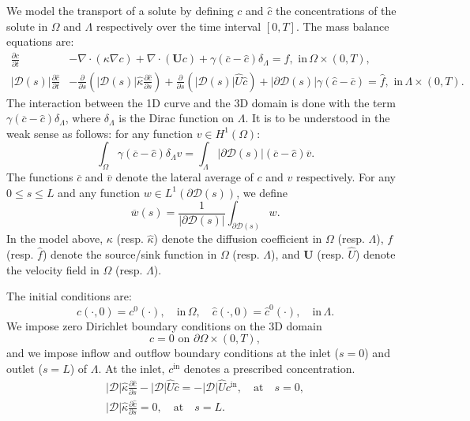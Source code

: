 \documentclass[pdflatex,sn-mathphys-num]{sn-jnl}%
\newcommand{\bfU}{{\boldsymbol U}}
\theoremstyle{thmstyleone}%
\theoremstyle{thmstyletwo}%
\theoremstyle{thmstylethree}%
\begin{document}
We model the transport of a solute by defining $c$ and $\hat c$ the concentrations of the solute in $\Omega$ and $\Lambda$ respectively over the time interval $[0,T]$. The mass balance equations are:
\begin{align}
\frac{\partial c}{\partial t} & - \nabla \cdot (\kappa \nabla c) +\nabla \cdot (\bfU c) 
+ \gamma (\overline{c} - \hat{c}) \delta_\Lambda = f, \,\, \mbox{in}\,\Omega\times (0,T),\label{eq:3D}\\
|\mathcal{D}(s)|\frac{\partial \hat c}{\partial t} & - \frac{\partial}{\partial s}\left(|\mathcal{D}(s)|\hat \kappa \frac{\partial\hat c}{\partial s}\right) +\frac{\partial}{\partial s}\left(|\mathcal{D}(s)| \hat U \hat c\right) + |\partial\mathcal{D}(s)|\gamma (\hat c-\overline{c}) 
= \hat f, \,\,\mbox{in}\,\Lambda\times (0,T).\label{eq:1D}
\end{align}
The interaction between the 1D curve and the 3D domain is done with the term $\gamma (\overline{c}-\hat c)\delta_\Lambda$, where $\delta_\Lambda$ is the Dirac function on $\Lambda$. It is to be understood in the weak sense as follows: for any function $v\in H^1(\Omega)$:
\[
\int_\Omega \gamma (\overline{c}-\hat c)\delta_\Lambda v
= \int_{\Lambda} \vert \partial \mathcal{D}(s)\vert (\overline{c}-\hat c) \overline{v}.
\]
The functions $\overline{c}$ and $\overline{v}$ denote the lateral average of $c$ and $v$ respectively. For any $0\leq s \leq L$ and any function $w\in L^1(\partial\mathcal{D}(s))$, we define
\[
\overline{w}(s) = \frac{1}{\vert \partial \mathcal{D}(s)\vert} \int_{\partial\mathcal{D}(s)} w.
\]
In the model above, $\kappa$ (resp. $\hat \kappa$) denote the diffusion coefficient in $\Omega$ (resp. $\Lambda$), $f$ (resp. $\hat f$) denote the source/sink function in $\Omega$ (resp. $\Lambda$), and $\bfU$
(resp. $\hat U$) denote the velocity field in $\Omega$ (resp. $\Lambda$).

The initial conditions are:
\begin{equation}\label{eq:initC}
c(\cdot,0) = c^0(\cdot), \quad \mbox{in}\, \Omega,\quad
\hat c(\cdot,0) = \hat c^0(\cdot), \quad \mbox{in}\,
\Lambda.
\end{equation}
We impose zero Dirichlet boundary conditions on the 3D domain
\begin{equation}
c = 0 \text{ on } \partial\Omega\times (0,T),
\end{equation}
and we impose inflow and outflow boundary conditions at the inlet ($s=0$) and outlet ($s=L$) of $\Lambda$. At the inlet, $c^\textrm{in}$ denotes a prescribed concentration.
%
\begin{align}
    |\mathcal{D}|\hat \kappa \frac{\partial\hat c}{\partial s} - |\mathcal{D}| \hat U \hat c = 
    - |\mathcal{D}| \hat U   c^{\mathrm{in}}, \quad
    \mbox{at} \quad s=0, \label{eq:bchat1}\\
    |\mathcal{D}|\hat \kappa \frac{\partial\hat c}{\partial s}  = 0, \quad
    \mbox{at} \quad s=L.
    \label{eq:bchat2}
\end{align}
\end{document}

